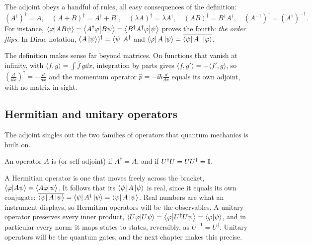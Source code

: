 The adjoint obeys a handful of rules, all easy consequences of the definition:
\[
  (A^\dagger)^\dagger=A,\quad (A+B)^\dagger=A^\dagger+B^\dagger,\quad (\lambda A)^\dagger=\bar\lambda A^\dagger,\quad (AB)^\dagger=B^\dagger A^\dagger,\quad (A^{-1})^\dagger=(A^\dagger)^{-1}.
\]
For instance, $\left\langle\varphi\middle|AB\psi\right\rangle=\left\langle A^\dagger\varphi\middle|B\psi\right\rangle=\left\langle B^\dagger A^\dagger\varphi\middle|\psi\right\rangle$ proves the fourth: \emph{the order flips}. In Dirac notation, $(A\left|\psi\right\rangle)^\dagger=\left\langle\psi\right| A^\dagger$ and $\left\langle\varphi\right| A\left|\psi\right\rangle=\overline{\left\langle\psi\right| A^\dagger\left|\varphi\right\rangle}$.

\begin{remark}
  The definition makes sense far beyond matrices. On functions that vanish at infinity, with $\langle f,g\rangle=\int\overline f\,g\dd x$, integration by parts gives $\langle f,g'\rangle=-\langle f',g\rangle$, so $(\frac{d}{dx})^\dagger=-\frac{d}{dx}$ and the momentum operator $\hat p=-\ii\hbar\frac{d}{dx}$ equals its own adjoint, with no matrix in sight.
\end{remark}

\subsection{Hermitian and unitary operators}

The adjoint singles out the two families of operators that quantum mechanics is built on.

\begin{definition}\label{def:herm-unit}
  An operator $A$ is  (or self-adjoint) if $A^\dagger=A$, and  if $U^\dagger U=UU^\dagger=\mathbb{I}$.
\end{definition}

A Hermitian operator is one that moves freely across the bracket, $\left\langle\varphi\middle|A\psi\right\rangle=\left\langle A\varphi\middle|\psi\right\rangle$. It follows that its  $\left\langle\psi\right| A\left|\psi\right\rangle$ is real, since it equals its own conjugate: $\overline{\left\langle\psi\right| A\left|\psi\right\rangle}=\left\langle\psi\right| A^\dagger\left|\psi\right\rangle=\left\langle\psi\right| A\left|\psi\right\rangle$. Real numbers are what an instrument displays, so Hermitian operators will be the observables.
A unitary operator preserves every inner product, $\left\langle U\varphi\middle|U\psi\right\rangle=\left\langle\varphi\middle|U^\dagger U\psi\right\rangle=\left\langle\varphi\middle|\psi\right\rangle$, and in particular every norm: it maps states to states, reversibly, as $U^{-1}=U^\dagger$. Unitary operators will be the quantum gates, and the next chapter makes this precise.

